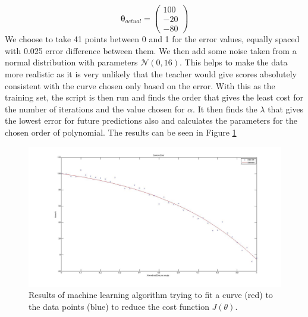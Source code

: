 \documentclass[10pt,a4paper]{article}
\begin{document}
\begin{equation}
\boldsymbol \theta_{actual} = 
\begin{pmatrix}
100\\
-20\\
-80
\end{pmatrix}
\end{equation}
We choose to take 41 points between 0 and 1 for the error values, equally spaced with 0.025 error difference between them. We then add some noise taken from a normal distribution with parameters $\mathcal{N}(0, 16)$. This helps to make the data more realistic as it is very unlikely that the teacher would give scores absolutely consistent with the curve chosen only based on the error. With this as the training set, the script is then run and finds the order that gives the least cost for the number of iterations and the value chosen for $\alpha$. It then finds the $\lambda$ that gives the lowest error for future predictions also and calculates the parameters for the chosen order of polynomial. The results can be seen in Figure \ref{machine_learning_results}

\begin{figure}[H]
\centering
\includegraphics[scale=0.15]{Score_Function_Machine_Learning.jpg}

\caption{Results of machine learning algorithm trying to fit a curve (red) to the data points (blue) to reduce the cost function $J(\theta)$.}
\label{machine_learning_results}
\end{figure}
\end{document}
